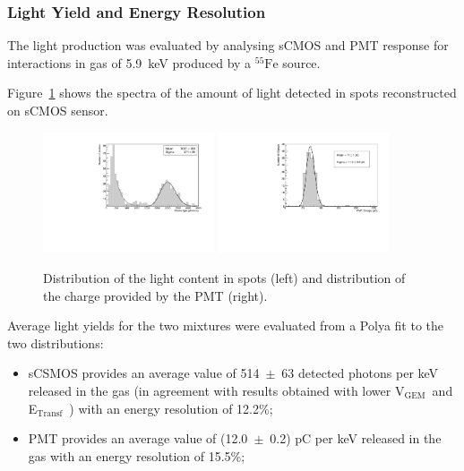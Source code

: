 \documentclass[review]{elsarticle}
\newcommand{\fe}{\ensuremath{^{55}\textrm{Fe}}\xspace}
\newcommand{\Et}  {E$_{\mathrm{Transf}}$\xspace}
\newcommand{\Vg}  {V$_{\mathrm{GEM}}$\xspace}
\begin{document}
\subsubsection{Light Yield and Energy Resolution}

The light production was evaluated by analysing sCMOS and PMT response for interactions in gas of 5.9~keV produced by a \fe source.

Figure~\ref{fig:light} shows the spectra of the amount of light detected in spots reconstructed on sCMOS sensor.

\begin{figure}[ht]
\centering
\includegraphics[width=0.45\textwidth]{DB_Integral_6040.pdf}
\includegraphics[width=0.45\textwidth]{newlightCharge_Run1834_Mix60-40.pdf}
\caption{Distribution of the light content in spots (left) and distribution of the charge provided by the PMT (right).} 
\label{fig:light}
\end{figure}

Average light yields for the two mixtures were evaluated from a Polya fit \cite{bib:rolandiblum} to the two distributions:
\begin{itemize}
    \item sCSMOS provides an average value of 514~$\pm$~63 detected photons per keV released in the gas (in agreement with results obtained with lower \Vg\ and \Et\ \cite{bib:fe55}) with an energy resolution of 12.2\%;
    \item PMT provides an average value of (12.0~$\pm$~0.2) pC per keV released in the gas with an energy resolution of 15.5\%;

\end{itemize}
\end{document}
